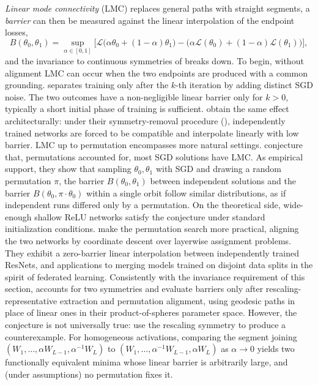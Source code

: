 \documentclass[mathematics,review,submit,moreauthors]{Definitions/mdpi}
\begin{document}
\emph{Linear mode connectivity} (LMC) replaces general paths with straight segments, a \emph{barrier} can then be measured against the linear interpolation of the endpoint losses,
\begin{equation}\label{eq:linear-barrier}
    B(\theta_0,\theta_1)=\sup_{\alpha\in[0,1]}\Big[\mathcal{L}\big(\alpha\theta_0+(1-\alpha)\theta_1\big)-\big(\alpha\mathcal{L}(\theta_0)+(1-\alpha)\mathcal{L}(\theta_1)\big)\Big],
\end{equation}
and the invariance to continuous symmetries of  breaks down.
To begin, without alignment LMC can occur when the two endpoints are produced with a common grounding.
\citet{frankle2020p3icml} separates training only after the $k$-th iteration by adding distinct SGD noise.
The two outcomes have a non-negligible linear barrier only for $k>0$, typically a short initial phase of training is sufficient.
\citet{lim2024} obtain the same effect architecturally: under their symmetry-removal procedure (), independently trained networks are forced to be compatible and interpolate linearly with low barrier.
LMC up to permutation encompasses more natural settings.
\citet{entezari2022} conjecture that, permutations accounted for, most SGD solutions have LMC.
As empirical support, they show that sampling $\theta_0,\theta_1$ with SGD and drawing a random permutation $\pi$, the barrier $B(\theta_0,\theta_1)$ between independent solutions and the barrier $B(\theta_0,\pi\cdot\theta_0)$ within a single orbit follow similar distributions, as if independent runs differed only by a permutation.
On the theoretical side, wide-enough shallow ReLU networks satisfy the conjecture under standard initialization conditions.
\citet{ainsworth2023} make the permutation search more practical, aligning the two networks by coordinate descent over layerwise assignment problems.
They exhibit a zero-barrier linear interpolation between independently trained ResNets, and applications to merging models trained on disjoint data splits in the spirit of federated learning.
Consistently with the invariance requirement of this section, \citet{pittorino2022jsm} accounts for two symmetries and evaluate barriers only after rescaling-representative extraction and permutation alignment, using geodesic paths in place of linear ones in their product-of-spheres parameter space.
However, the conjecture is not universally true: \citet{zhao2025a} use the rescaling symmetry to produce a counterexample.
For homogeneous activations, comparing the segment joining $(W_1,\dots,\alpha W_{L-1},\alpha^{-1}W_L)$ to $(W_1,\dots,\alpha^{-1}W_{L-1},\alpha W_L)$ as $\alpha\to0$ yields two functionally equivalent minima whose linear barrier is arbitrarily large, and (under assumptions) no permutation fixes it.
\end{document}
